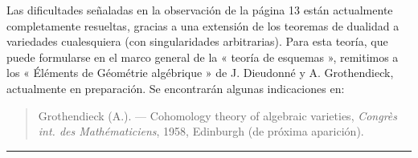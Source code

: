 Las dificultades señaladas en la observación de la página 13 están actualmente
completamente resueltas, gracias a una extensión de los teoremas de dualidad a
variedades cualesquiera (con singularidades arbitrarias). Para esta teoría, que puede
formularse en el marco general de la « teoría de esquemas », remitimos
a los « Éléments de Géométrie algébrique » de J. Dieudonné y A. Grothendieck,
actualmente en preparación. Se encontrarán algunas indicaciones en:

\begin{quote}
Grothendieck (A.). --- Cohomology theory of algebraic varieties,
\emph{Congrès int. des Mathématiciens}, 1958, Edinburgh (de próxima aparición).
\end{quote}

\begin{flushright}
[Abril de 1959]
\end{flushright}

\begin{center}\rule{36mm}{0.5pt}\end{center}
